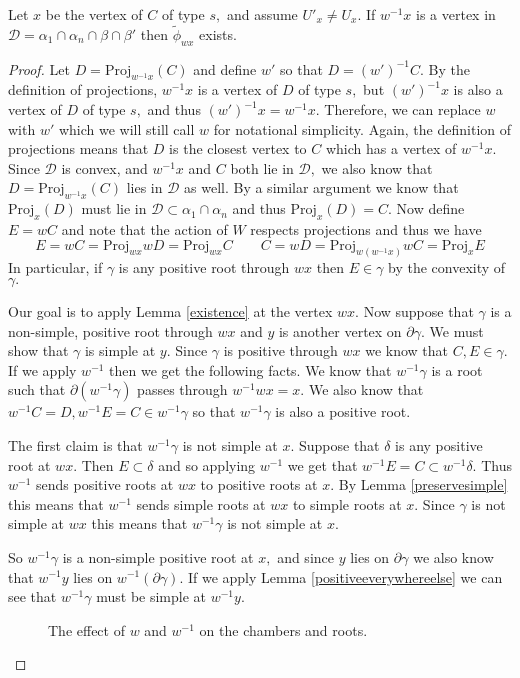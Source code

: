 \documentclass[class=book, crop=false,12 pt]{standalone}
\begin{document}
\begin{lemma}
	\label{Dexists}
	Let $x$ be the vertex of $C$ of type $s,$ and assume $U'_x\neq U_x.$ If $w^{-1}x$ is a vertex in $\mathcal{D}=\alpha_1\cap \alpha_n\cap \beta \cap \beta'$ then $\tilde{\phi}_{wx}$ exists.
\end{lemma}
\begin{proof}
	Let $D=\mathrm{Proj}_{w^{-1}x}(C)$ and define $w'$ so that $D=(w')^{-1}C.$ By the definition of projections, $w^{-1}x$ is a vertex of $D$ of type $s,$ but $(w')^{-1}x$ is also a vertex of $D$ of type $s,$ and thus $(w')^{-1}x=w^{-1}x.$ Therefore, we can replace $w$ with $w'$ which we will still call $w$ for notational simplicity. Again, the definition of projections means that $D$ is the closest vertex to $C$ which has a vertex of $w^{-1}x.$ Since $\mathcal{D}$ is convex, and $w^{-1}x$ and $C$ both lie in $\mathcal{D},$ we also know that $D=\mathrm{Proj}_{w^{-1}x}(C)$ lies in $\mathcal{D}$ as well. By a similar argument we know that $\mathrm{Proj}_{x}(D)$ must lie in $\mathcal{D}\subset \alpha_1\cap \alpha_n$ and thus $\mathrm{Proj}_{x}(D)=C.$ Now define $E=wC$ and note that the action of $W$ respects projections and thus we have
	\[
		E=wC=\mathrm{Proj}_{wx}{wD}=\mathrm{Proj}_{wx}{C} \qquad C=wD=\mathrm{Proj}_{w(w^{-1}x)}{wC}=\mathrm{Proj}_{x}{E}
	\]
In particular, if $\gamma$ is any positive root through $wx$ then $E\in \gamma$ by the convexity of $\gamma.$

Our goal is to apply Lemma \ref{existence} at the vertex $wx.$ Now suppose that $\gamma$ is a non-simple, positive root through $wx$ and $y$ is another vertex on $\partial \gamma.$ We must show that $\gamma$ is simple at $y.$ Since $\gamma$ is positive through $wx$ we know that $C,E\in \gamma.$ If we apply $w^{-1}$ then we get the following facts. We know that $w^{-1}\gamma$ is a root such that $\partial (w^{-1}\gamma)$ passes through $w^{-1}wx=x.$ We also know that $w^{-1}C=D,w^{-1}E=C\in w^{-1}\gamma$ so that $w^{-1}\gamma$ is also a positive root.

The first claim is that $w^{-1}\gamma$ is not simple at $x.$ Suppose that $\delta$ is any positive root at $wx.$ Then $E\subset \delta$ and so applying $w^{-1}$ we get that $w^{-1}E=C\subset w^{-1}\delta.$ Thus $w^{-1}$ sends positive roots at $wx$ to positive roots at $x.$ By Lemma \ref{preservesimple} this means that $w^{-1}$ sends simple roots at $wx$ to simple roots at $x.$ Since $\gamma$ is not simple at $wx$ this means that $w^{-1}\gamma$ is not simple at $x.$

So $w^{-1}\gamma$ is a non-simple positive root at $x,$ and since $y$ lies on $\partial \gamma$ we also know that $w^{-1}y$ lies on $w^{-1}(\partial \gamma).$ If we apply Lemma \ref{positiveeverywhereelse} we can see that $w^{-1}\gamma$ must be simple at $w^{-1}y.$ 
\begin{figure}[h]
	\label{mappicture}
\caption{The effect of $w$ and $w^{-1}$ on the chambers and roots.}
\end{figure}



\end{proof}
\end{document}
